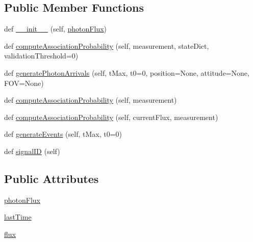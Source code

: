 \subsection*{Public Member Functions}
\begin{DoxyCompactItemize}
\item 
def \hyperlink{classmodest_1_1signals_1_1xraysource_1_1UniformNoiseXRaySource_a2bf2964e92d4540de35c6eebfe4944db}{\+\_\+\+\_\+init\+\_\+\+\_\+} (self, \hyperlink{classmodest_1_1signals_1_1xraysource_1_1UniformNoiseXRaySource_a9b8049972baf6e0640181b58850a3d20}{photon\+Flux})
\item 
def \hyperlink{classmodest_1_1signals_1_1xraysource_1_1UniformNoiseXRaySource_aa4732c82202fd8c607ae0f8244be3272}{compute\+Association\+Probability} (self, measurement, state\+Dict, validation\+Threshold=0)
\item 
def \hyperlink{classmodest_1_1signals_1_1xraysource_1_1UniformNoiseXRaySource_a49216b600aa1a4a5d4facfadfb34b8bb}{generate\+Photon\+Arrivals} (self, t\+Max, t0=0, position=None, attitude=None, F\+OV=None)
\item 
def \hyperlink{classmodest_1_1signals_1_1poissonsource_1_1StaticPoissonSource_a1754d94bff46d97817438bab552afef9}{compute\+Association\+Probability} (self, measurement)
\item 
def \hyperlink{classmodest_1_1signals_1_1poissonsource_1_1PoissonSource_a2f8a73e6f51cbdcd0f1e646d6f4d4574}{compute\+Association\+Probability} (self, current\+Flux, measurement)
\item 
def \hyperlink{classmodest_1_1signals_1_1poissonsource_1_1StaticPoissonSource_acc0f087c93d5e90070f4cd0be95ace74}{generate\+Events} (self, t\+Max, t0=0)
\item 
def \hyperlink{classmodest_1_1signals_1_1signalsource_1_1SignalSource_a9a64c6a9c2954f6ad61e4ca3518ea8ab}{signal\+ID} (self)
\end{DoxyCompactItemize}
\subsection*{Public Attributes}
\begin{DoxyCompactItemize}
\item 
\hyperlink{classmodest_1_1signals_1_1xraysource_1_1UniformNoiseXRaySource_a9b8049972baf6e0640181b58850a3d20}{photon\+Flux}
\item 
\hyperlink{classmodest_1_1signals_1_1poissonsource_1_1PoissonSource_a34395fc83bd8743a0a5ee69f9392a606}{last\+Time}
\item 
\hyperlink{classmodest_1_1signals_1_1poissonsource_1_1PoissonSource_a6f2c657ad936b921715d826ac74f7fe5}{flux}
\end{DoxyCompactItemize}
